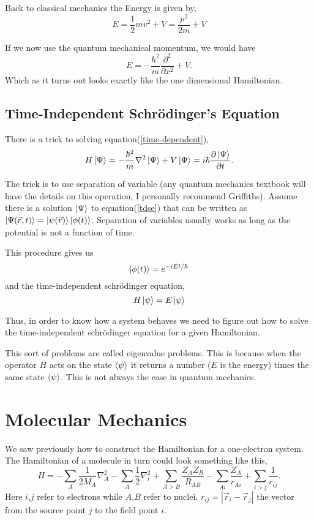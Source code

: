 \documentclass[a4paper]{article}
\begin{document}
Back to classical mechanics the Energy is given by,
$$
E =  \frac{1}{2}mv^2 + V = \frac{p^2}{2m} + V
$$

If we now use the quantum mechanical momentum, we would have
$$
E = - \frac{\hbar^2}{m} \frac{\partial^2}{\partial x^2} + V.
$$
Which as it turns out looks exactly like the one dimensional Hamiltonian.

\subsection{Time-Independent Schr\"odinger's Equation}
There is a trick to solving equation(\ref{time-dependent}),
\begin{equation} \label{tdse}
H \ket{\Psi} = -\frac{\hbar^2}{m}\nabla^2 \ket{\Psi} + V\ket{\Psi} = i\hbar\frac{\partial\ket{\Psi}}{\partial t}.
\end{equation}

The trick is to use separation of variable (any quantum mechanics textbook will have the details on this operation, I personally recommend Griffiths).
Assume there is a solution $\ket{\Psi}$ to equation(\ref{tdse}) that can be written as $\ket{\Psi(\vec{r},t)} = \ket{\psi(\vec{r})}\ket{\phi(t)}$.
Separation of variables usually works as long as the potential is not a function of time.

This procedure gives us
$$
\ket{\phi(t)} = e^{-iEt/\hbar}
$$
and the time-independent schr\"odinger equation,
$$ H\ket{\psi} = E\ket{\psi} $$

Thus, in order to know how a system behaves we need to figure out how to solve the time-independent schr\"odinger equation for a given Hamiltonian. 

This sort of problems are called eigenvalue problems.
This is because when the operator $H$ acts on the state $\braket{\psi}$ it returns a number ($E$ is the energy) times the same state $\braket{\psi}$.
This is not always the case in quantum mechanics.



\section{Molecular Mechanics}
We saw previously how to construct the Hamiltonian for a one-electron system.
The Hamiltonian of a molecule in turn could look something like this,
\begin{equation} \label{molecule}
H = -\sum_A \frac{1}{2M_A} \nabla^{2}_{A} -\sum_A \frac{1}{2} \nabla^{2}_{i} +
\sum_{A>B} \frac{Z_A Z_B}{R_{AB}} - \sum_{Ai} \frac{Z_A}{r_{Ai}} +
\sum_{i>j} \frac{1}{r_{ij}}.
\end{equation}
Here $i$,$j$ refer to electrons while $A$,$B$ refer to nuclei.
$r_{ij} = |\vec{r}_i - \vec{r}_j|$ the vector from the source point $j$ to the field point $i$.
\end{document}
